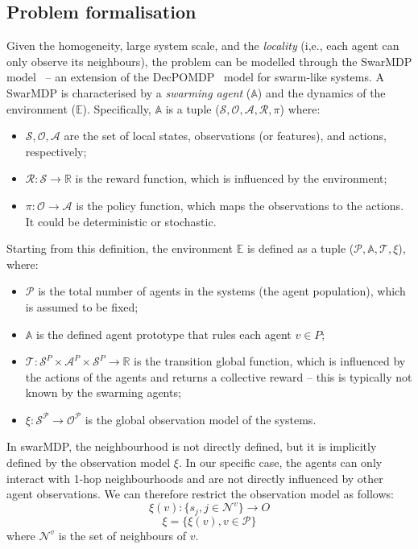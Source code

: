 \documentclass[conference]{IEEEtran}
\begin{document}
\subsection{Problem formalisation}
Given the homogeneity, large system scale, and the \emph{locality} (i,e., each agent can only observe its neighbours), 
 the problem can be modelled through the SwarMDP model~\cite{DBLP:conf/atal/SosicKZK17} -- 
 an extension of the \ac{DecPOMDP}~\cite{Decpomdp2000} model for swarm-like systems.
% 
A SwarMDP is characterised by a \emph{swarming agent} ($\mathbb{A}$) and the dynamics of the environment ($\mathbb{E}$).
Specifically, $\mathbb{A}$ is a tuple ($\mathcal{S}, \mathcal{O}, \mathcal{A}, \mathcal{R}, \pi$) where:
\begin{itemize}
  \item $\mathcal{S, O, A}$ are the set of local states, observations (or features), and actions, respectively;
  \item $\mathcal{R}: \mathcal{S} \rightarrow \mathbb{R}$ is the reward function, which is influenced by the environment;
  \item $\pi: \mathcal{O} \rightarrow \mathcal{A}$ is the policy function, which maps the observations to the actions. It could be deterministic or stochastic.
\end{itemize}
Starting from this definition, the environment $\mathbb{E}$ is defined as a tuple ($\mathcal{P}, \mathbb{A}, \mathcal{T}, \xi$), where:
\begin{itemize}
  \item $\mathcal{P}$ is the total number of agents in the systems (the agent population), which is assumed to be fixed;
  \item $\mathbb{A}$ is the defined agent prototype that rules each agent $v \in P$;
  \item $\mathcal{T}: \mathcal{S}^P \times \mathcal{A}^P \times \mathcal{S}^P \rightarrow \mathbb{R}$ is the transition  global function, which is influenced by the actions of the agents and returns a collective reward -- this is typically not known by the swarming agents;
  \item $\xi: \mathcal{S^P} \rightarrow \mathcal{O^P}$ is the global observation model of the systems.
\end{itemize}
In swarMDP, the neighbourhood is not directly defined, but it is implicitly defined by the observation model $\xi$.
In our specific case, the agents can only interact with 1-hop neighbourhoods and are not directly influenced by other agent observations. We can therefore restrict the observation model as follows:
\begin{equation}
\xi(v): \{s_j, j \in \mathcal{N}^v\} \rightarrow O
\end{equation}
\begin{equation}
\xi = \{\xi(v), v \in \mathcal{P}\}
\end{equation}
where $\mathcal{N}^v$ is the set of neighbours of $v$.
\end{document}
